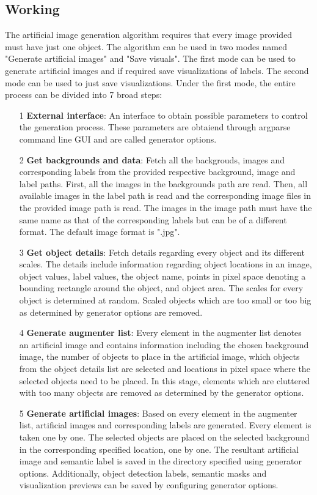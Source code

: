 \documentclass[paper=a4,11pt,parskip=half,toc=listof]{scrartcl}
\begin{document}
\subsection{Working}
The artificial image generation algorithm requires that every image provided must have just one object. The algorithm can be used in two modes named "Generate artificial images" and "Save visuals". The first mode can be used to generate artificial images and if required save visualizations of labels. The second mode can be used to just save visualizations. Under the first mode, the entire process can be divided into 7 broad steps:
	\begin{itemize}
		\item[1] \textbf{External interface}: An interface to obtain possible parameters to control the generation process. These parameters are obtaiend through argparse command line GUI and are called generator options.
		\item[2] \textbf{Get backgrounds and data}: Fetch all the backgrouds, images and corresponding labels from the provided respective background, image and label paths. First, all the images in the backgrounds path are read. Then, all available images in the label path is read and the corresponding image files in the provided image path is read. The images in the image path must have the same name as that of the corresponding labels but can be of a different format. The default image format is ".jpg".
		\item[3] \textbf{Get object details}: Fetch details regarding every object and its different scales. The details include information regarding object locations in an image, object values, label values, the object name, points in pixel space denoting a bounding rectangle around the object, and object area. The scales for every object is determined at random. Scaled objects which are too small or too big as determined by generator options are removed.
		\item[4] \textbf{Generate augmenter list}: Every element in the augmenter list denotes an artificial image and contains information including the chosen background image, the number of objects to place in the artificial image, which objects from the object details list are selected and locations in pixel space where the selected objects need to be placed. In this stage, elements which are cluttered with too many objects are removed as determined by the generator options.
		\item[5] \textbf{Generate artificial images}: Based on every element in the augmenter list, artificial images and corresponding labels are generated. Every element is taken one by one. The selected objects are placed on the selected background in the corresponding specified location, one by one. The resultant artificial image and semantic label is saved in the directory specified using generator options. Additionally, object detection labels, semantic masks and visualization previews can be saved by configuring generator options.

\end{itemize}
\end{document}
